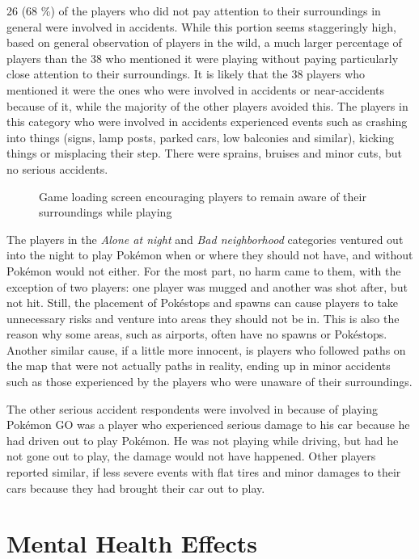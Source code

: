 26 (68 \%) of the players who did not pay attention to their surroundings in general were involved in accidents. While this portion seems staggeringly high, based on general observation of players in the wild, a much larger percentage of players than the 38 who mentioned it were playing without paying particularly close attention to their surroundings. It is likely that the 38 players who mentioned it were the ones who were involved in accidents or near-accidents because of it, while the majority of the other players avoided this. The players in this category who were involved in accidents experienced events such as crashing into things (signs, lamp posts, parked cars, low balconies and similar), kicking things or misplacing their step. There were sprains, bruises and minor cuts, but no serious accidents.

\begin{figure}[h]
	\centering
	\caption{Game loading screen encouraging players to remain aware of their surroundings while playing}
	\label{fig:loading-screen-aware-of-surroundings}
\end{figure}

The players in the \emph{Alone at night} and \emph{Bad neighborhood} categories ventured out into the night to play Pokémon when or where they should not have, and without Pokémon would not either. For the most part, no harm came to them, with the exception of two players: one player was mugged  and another was shot after, but not hit. Still, the placement of Pokéstops and spawns can cause players to take unnecessary risks and venture into areas they should not be in. This is also the reason why some areas, such as airports, often have no spawns or Pokéstops. Another similar cause, if a little more innocent, is players who followed paths on the map that were not actually paths in reality, ending up in minor accidents such as those experienced by the players who were unaware of their surroundings.

The other serious accident respondents were involved in because of playing Pokémon GO was a player who experienced serious damage to his car because he had driven out to play Pokémon. He was not playing while driving, but had he not gone out to play, the damage would not have happened. Other players reported similar, if less severe events with flat tires and minor damages to their cars because they had brought their car out to play.


\chapter{Mental Health Effects}
\label{chapter:player-study-mental}


